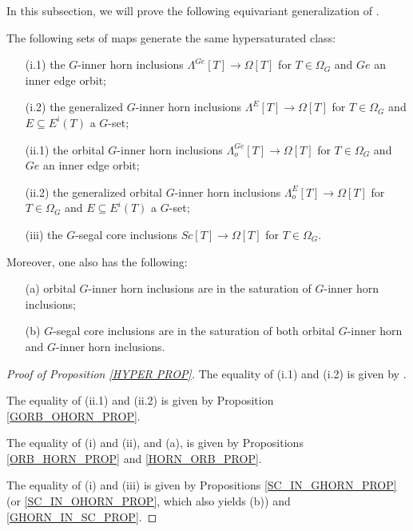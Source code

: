\documentclass[a4paper,10pt,draft]{article}%
\begin{document}
In this subsection, we will prove the following equivariant generalization of \cite[Props. 2.4 and 2.5]{CM13a}.

\begin{proposition}
      The following sets of maps generate the same hypersaturated class:
      \begin{enumerate}
      \item[(i.1)] the $G$-inner horn inclusions
            $\Lambda^{Ge} [T] \to \Omega[T]$ for $T \in \Omega_G$ and $Ge$ an inner edge orbit;
      \item[(i.2)] the generalized $G$-inner horn inclusions
            $\Lambda^{E} [T] \to \Omega[T]$ for $T \in \Omega_G$ and $E \subseteq E^i(T)$ a $G$-set;
      \item[(ii.1)] the orbital $G$-inner horn inclusions
            $\Lambda^{Ge}_o [T] \to \Omega[T]$ for $T \in \Omega_G$ and $Ge$ an inner edge orbit;
      \item[(ii.2)] the generalized orbital $G$-inner horn inclusions
            $\Lambda^{E}_o [T] \to \Omega[T]$ for $T \in \Omega_G$ and $E \subseteq E^i(T)$ a $G$-set;
      \item[(iii)] the $G$-segal core inclusions
            $Sc [T] \to \Omega[T]$ for $T \in \Omega_G$.
      \end{enumerate}
      Moreover, one also has the following:
      \begin{itemize}
      \item[(a)] orbital $G$-inner horn inclusions are in the saturation of $G$-inner horn inclusions;
      \item[(b)] $G$-segal core inclusions are in the saturation of both orbital $G$-inner horn and $G$-inner horn inclusions.
      \end{itemize}
\end{proposition}





\begin{proof}[Proof of Proposition \ref{HYPER PROP}]
      The equality of (i.1) and (i.2) is given by \cite[Proposition 6.17]{Per17}.
      
      The equality of (ii.1) and (ii.2) is given by Proposition \ref{GORB_OHORN_PROP}.

      The equality of (i) and (ii), and (a), is given by Propositions \ref{ORB_HORN_PROP} and \ref{HORN_ORB_PROP}.

      The equality of (i) and (iii) is given by Propositions \ref{SC_IN_GHORN_PROP}
      (or \ref{SC_IN_OHORN_PROP}, which also yields (b)) and \ref{GHORN_IN_SC_PROP}.
\end{proof}
\end{document}
